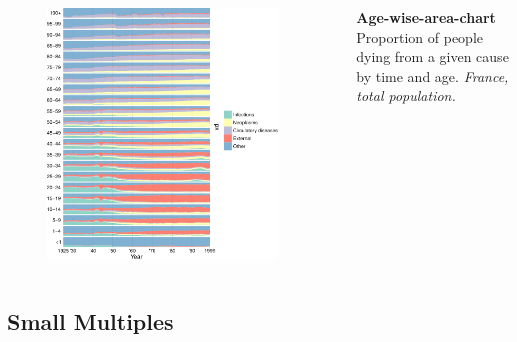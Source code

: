 \documentclass{beamer}
\begin{document}
\begin{frame}
\frametitle{\insertsection}

\begin{columns}[c]

\begin{figure}[htb!]
\includegraphics[width = 0.93\textwidth]{./fig/agewise_area.pdf}
\end{figure}

\small \textbf{Age-wise-area-chart}\\ Proportion of people dying from a given cause by time and age. \scriptsize\emph{France, total population.}

\end{columns}

\end{frame}

%

\subsection{Small Multiples}
\end{document}
